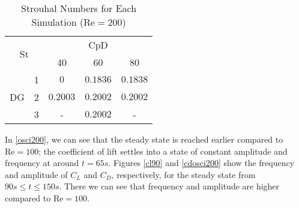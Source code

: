 \begin{table}[htp]
	\centering
	\def\arraystretch{1.5}
	\begin{tabular}{|c|c|c|c|c|}
		\hline
		\multicolumn{2}{|c|}{\multirow{2}{*}{St}} & \multicolumn{3}{c|}{CpD} \\ \cline{3-5} 
		\multicolumn{2}{|c|}{}                       & 40     & 60    & 80    \\ \hline
		\multirow{3}{*}{DG}            & 1           &    $0$    &    $0.1836$   &    $0.1838$    \\ \cline{2-5} 
		& 2           &     $0.2003$   &    $0.2002$   &     $0.2002$   \\ \cline{2-5} 
		& 3           &     -   &    $0.2002$   &    -    \\ \hline
	\end{tabular}
	\caption{Strouhal Numbers for Each Simulation ($\text{Re} = 200$)}	
	\label{Str200}
\end{table}
\newpage
In \cref{osci200}, we can see that the steady state is reached earlier compared to $\text{Re}=100$; the coefficient of lift settles into a state of constant amplitude and frequency at around $t=65s$. Figures \ref{cl90} and \ref{cdosci200} show the frequency and amplitude of $C_L$ and $C_D$, respectively, for the steady state from $90s \leq t \leq 150s$. There we can see that frequency and amplitude are higher compared to $\text{Re}=100$.


